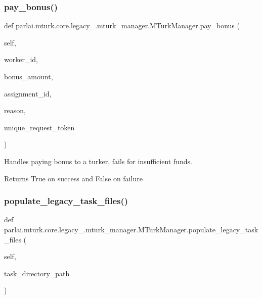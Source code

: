 \subsubsection{\texorpdfstring{pay\+\_\+bonus()}{pay\_bonus()}}
{\footnotesize\ttfamily def parlai.\+mturk.\+core.\+legacy\+\_.\+mturk\+\_\+manager.\+M\+Turk\+Manager.\+pay\+\_\+bonus (\begin{DoxyParamCaption}\item[{}]{self,  }\item[{}]{worker\+\_\+id,  }\item[{}]{bonus\+\_\+amount,  }\item[{}]{assignment\+\_\+id,  }\item[{}]{reason,  }\item[{}]{unique\+\_\+request\+\_\+token }\end{DoxyParamCaption})}

\begin{DoxyVerb}Handles paying bonus to a turker, fails for insufficient funds.

Returns True on success and False on failure
\end{DoxyVerb}
 \mbox{\label{classparlai_1_1mturk_1_1core_1_1legacy__2018_1_1mturk__manager_1_1MTurkManager_aad2d2657fc0c00b043d12b8391267308}} 
\subsubsection{\texorpdfstring{populate\+\_\+legacy\+\_\+task\+\_\+files()}{populate\_legacy\_task\_files()}}
{\footnotesize\ttfamily def parlai.\+mturk.\+core.\+legacy\+\_.\+mturk\+\_\+manager.\+M\+Turk\+Manager.\+populate\+\_\+legacy\+\_\+task\+\_\+files (\begin{DoxyParamCaption}\item[{}]{self,  }\item[{}]{task\+\_\+directory\+\_\+path }\end{DoxyParamCaption})}

